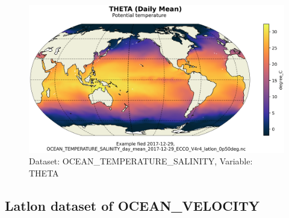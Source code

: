\begin{figure}[H]
\centering
\includegraphics[scale=0.55]{../images/plots/latlon_plots/Ocean_Temperature_and_Salinity/THETA.png}
\caption{Dataset: OCEAN\_TEMPERATURE\_SALINITY, Variable: THETA}
\label{tab:table-OCEAN_TEMPERATURE_SALINITY_THETA-Plot}
\end{figure}
\subsection{Latlon dataset of OCEAN\_VELOCITY}
\newp
